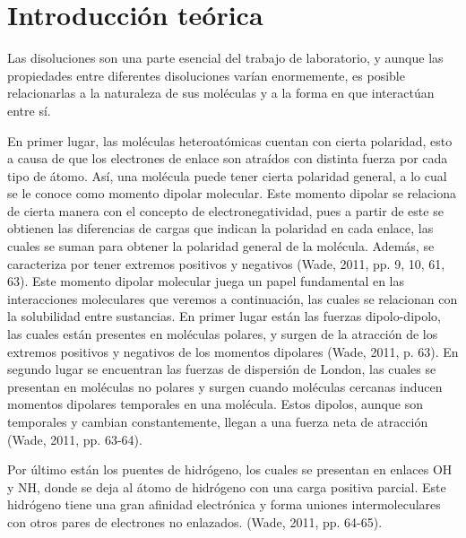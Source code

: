 
\section{Introducción teórica}

Las disoluciones son una parte esencial del trabajo de laboratorio, y aunque las propiedades entre diferentes disoluciones varían enormemente, es posible relacionarlas a la naturaleza de sus moléculas y a la forma en que interactúan entre sí.

En primer lugar, las moléculas heteroatómicas cuentan con cierta polaridad, esto a causa de que los electrones de enlace son atraídos con distinta fuerza por cada tipo de átomo. Así, una molécula puede tener cierta polaridad general, a lo cual se le conoce como momento dipolar molecular. Este momento dipolar se relaciona de cierta manera con el concepto de electronegatividad, pues a partir de este se obtienen las diferencias de cargas que indican la polaridad en cada enlace, las cuales se suman para obtener la polaridad general de la molécula. Además, se caracteriza por tener extremos positivos y negativos (Wade, 2011, pp. 9, 10, 61, 63). Este momento dipolar molecular juega un papel fundamental en las interacciones moleculares que veremos a continuación, las cuales se relacionan con la solubilidad entre sustancias. En primer lugar están las fuerzas dipolo-dipolo, las cuales están presentes en moléculas polares, y surgen de la atracción de los extremos positivos y negativos de los momentos dipolares (Wade, 2011, p. 63). En segundo lugar se encuentran las fuerzas de dispersión de London, las cuales se presentan en moléculas no polares y surgen cuando moléculas cercanas inducen momentos dipolares temporales en una molécula. Estos dipolos, aunque son temporales y cambian constantemente, llegan a una fuerza neta de atracción (Wade, 2011, pp. 63-64).

Por último están los puentes de hidrógeno, los cuales se presentan en enlaces OH y NH, donde se deja al átomo de hidrógeno con una carga positiva parcial. Este hidrógeno tiene una gran afinidad electrónica y forma uniones intermoleculares con otros pares de electrones no enlazados. (Wade, 2011, pp. 64-65).

